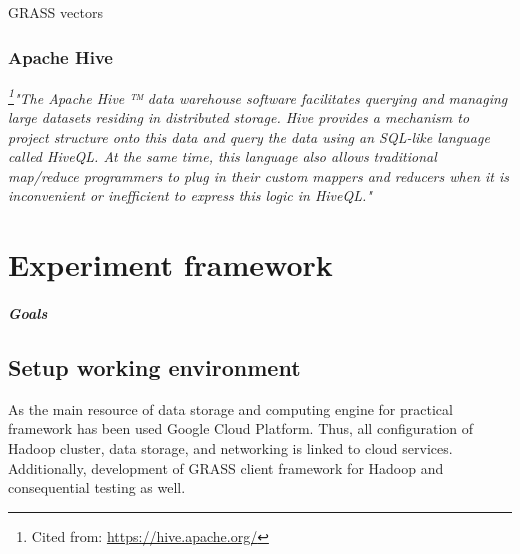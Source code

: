 \documentclass[a4paper,12pt,oneside]{report}
\begin{document}
GRASS vectors 


    \subsection{Apache Hive }
\textit{\footnote{Cited from: \url{https://hive.apache.org/}}"The Apache Hive ™ data warehouse software 
facilitates querying and managing large datasets residing in distributed storage. Hive provides a mechanism 
to project structure onto this data and query the data using an SQL-like language called HiveQL. At the same
time, this language also allows traditional map/reduce programmers to plug in their custom mappers and 
reducers when it is inconvenient or inefficient to express this logic in HiveQL."}




    
\newpage
\chapter*{Experiment framework}
\paragraph{Goals}


\section{Setup working environment}
As the main resource of data storage and computing engine for practical framework has been used Google Cloud Platform.
 Thus, all configuration of Hadoop cluster, data storage, and networking is linked to cloud services. Additionally,
  development of GRASS client framework for Hadoop and consequential testing  as well.
\end{document}
